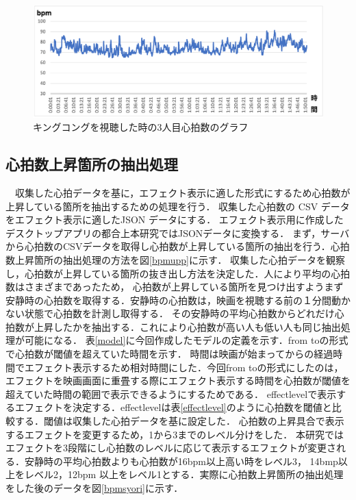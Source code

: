 \begin{figure}[H]
    \centering
    \includegraphics[width=16cm]{images/chapter3/gurafu1.png}
    \caption{キングコングを視聴した時の3人目心拍数のグラフ}
    \label{sannninme}
\end{figure}

\subsection{心拍数上昇箇所の抽出処理}
　収集した心拍データを基に，エフェクト表示に適した形式にするため心拍数が上昇している箇所を抽出するための処理を行う．
収集した心拍数の CSV データをエフェクト表示に適したJSON データにする．
エフェクト表示用に作成したデスクトップアプリの都合上本研究ではJSONデータに変換する．
まず，サーバから心拍数のCSVデータを取得し心拍数が上昇している箇所の抽出を行う．心拍数上昇箇所の抽出処理の方法を図\ref{bpmupp}に示す．
収集した心拍データを観察し，心拍数が上昇している箇所の抜き出し方法を決定した．人により平均の心拍数はさまざまであったため，
心拍数が上昇している箇所を見つけ出すようまず安静時の心拍数を取得する．安静時の心拍数は，映画を視聴する前の１分間動かない状態で心拍数を計測し取得する．
その安静時の平均心拍数からどれだけ心拍数が上昇したかを抽出する．これにより心拍数が高い人も低い人も同じ抽出処理が可能になる．
表\ref{model}に今回作成したモデルの定義を示す．from toの形式で心拍数が閾値を超えていた時間を示す．
時間は映画が始まってからの経過時間でエフェクト表示するため相対時間にした．今回from toの形式にしたのは，
エフェクトを映画画面に重畳する際にエフェクト表示する時間を心拍数が閾値を超えていた時間の範囲で表示できるようにするためである．
effectlevelで表示するエフェクトを決定する．effectlevelは表\ref{effectlevel}のように心拍数を閾値と比較する．閾値は収集した心拍データを基に設定した．
心拍数の上昇具合で表示するエフェクトを変更するため，1から3までのレベル分けをした．
本研究ではエフェクトを3段階にし心拍数のレベルに応じて表示するエフェクトが変更される．安静時の平均心拍数よりも心拍数が16bpm以上高い時をレベル3，
14bmp以上をレベル2，12bpm 以上をレベル1とする．実際に心拍数上昇箇所の抽出処理をした後のデータを図\ref{bpmsyori}に示す．


